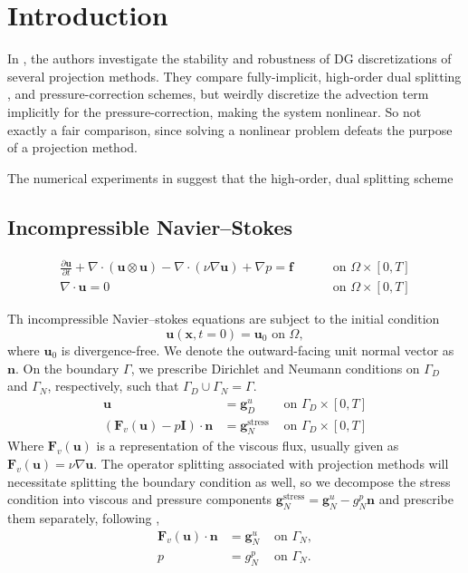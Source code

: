 
\section{Introduction}


In \cite{fehn_robust_2018}, the authors investigate the stability and robustness of DG discretizations of several projection methods. They compare fully-implicit, high-order dual splitting \cite{karniadakis_high-order_1991}, and pressure-correction schemes, but weirdly discretize the advection term implicitly for the pressure-correction, making the system nonlinear. So not exactly a fair comparison, since solving a nonlinear problem defeats the purpose of a projection method.

The numerical experiments in \cite{fehn_robust_2018} suggest that the high-order, dual splitting scheme 


\subsection{Incompressible Navier--Stokes}
\begin{equation}
  \begin{aligned}
  \frac{\partial \bm{u}}{\partial t} 
    + \nabla \cdot \left(\bm{u} \otimes \bm{u}\right) 
    - \nabla \cdot \left(\nu \nabla\bm{u}\right)
    + \nabla p = \bm{f} & \qquad \text{ on } \Omega \times [0,T] \\
    \nabla \cdot \bm{u} = 0 & \qquad  \text{ on } \Omega \times [0,T]
  \end{aligned}
  \label{eq:INS}
\end{equation}

Th incompressible Navier--stokes equations are subject to the initial condition
\begin{equation}
  \bm{u}(\bm{x},t=0) = \bm{u}_0 \text{ on } \Omega,
\end{equation}
where $\bm{u}_0$ is divergence-free. We denote the outward-facing unit normal vector as $\bm{n}$.  On the boundary $\Gamma$, we prescribe Dirichlet and Neumann conditions on $\Gamma_D$ and $\Gamma_N$, respectively, such that $\Gamma_D \cup \Gamma_N = \Gamma$.  
\begin{eqnarray}
  \bm{u} &= \bm{g}_D^u & \text{ on } \Gamma_D \times [0,T] \\ 
  \left(\bm{F}_v\left(\bm{u}\right) - p\bm{I}\right)\cdot\bm{n} &= \bm{g}_N^{\text{stress}} & \text{ on } \Gamma_D \times [0,T] 
\end{eqnarray}
Where $\bm{F}_v(\bm{u})$ is a representation of the viscous flux, usually given as $\bm{F}_v(\bm{u})=\nu \nabla \bm{u}$. The operator splitting associated with projection methods will necessitate splitting the boundary condition as well, so we decompose the stress condition into viscous and pressure components $\bm{g}_N^{\text{stress}} = \bm{g}_N^u - g_N^p\bm{n}$ and prescribe them separately, following \cite{fehn_robust_2018},
\begin{eqnarray}
  \bm{F}_v(\bm{u}) \cdot\bm{n} &= \bm{g}_N^u & \text{ on } \Gamma_N, \\
  p &= g_N^p & \text{ on } \Gamma_N.
\end{eqnarray}

